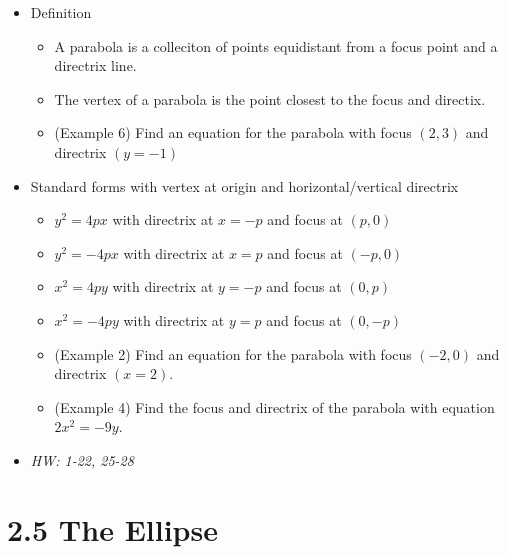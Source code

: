\documentclass[11pt]{article}
\begin{document}
\begin{itemize}
  \item Definition
    \begin{itemize}
      \item A parabola is a colleciton of points equidistant from a focus point
        and a directrix line.
      \item The vertex of a parabola is the point closest to the focus and
        directix.
      \item (Example 6) Find an equation for the parabola with focus \((2,3)\)
        and directrix \((y=-1)\)
    \end{itemize}
  \item Standard forms with vertex at origin and horizontal/vertical directrix
    \begin{itemize}
      \item \(y^2=4px\) with directrix at \(x=-p\) and focus at \((p,0)\)
      \item \(y^2=-4px\) with directrix at \(x=p\) and focus at \((-p,0)\)
      \item \(x^2=4py\) with directrix at \(y=-p\) and focus at \((0,p)\)
      \item \(x^2=-4py\) with directrix at \(y=p\) and focus at \((0,-p)\)
      \item (Example 2) Find an equation for the parabola with focus
            \((-2,0)\) and directrix \((x=2)\).
      \item (Example 4) Find the focus and directrix of the parabola with
            equation \(2x^2=-9y\).
    \end{itemize}
  \item\textit{
    HW: 1-22, 25-28
  }
\end{itemize}

\section*{2.5 The Ellipse}
\end{document}

